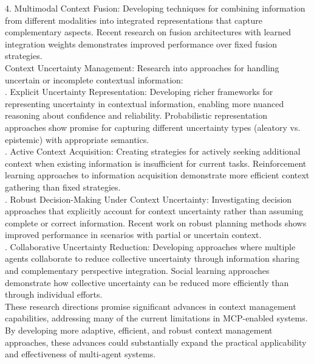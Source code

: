 4. Multimodal Context Fusion: Developing techniques for combining information from different modalities into integrated representations that capture complementary aspects. Recent research on fusion architectures with learned integration weights demonstrates improved performance over fixed fusion strategies.\\ \newline
Context Uncertainty Management: Research into approaches for handling uncertain or incomplete contextual information:\\ . Explicit Uncertainty Representation: Developing richer frameworks for representing uncertainty in contextual information, enabling more nuanced reasoning about confidence and reliability. Probabilistic representation approaches show promise for capturing different uncertainty types (aleatory vs. epistemic) with appropriate semantics.\\ . Active Context Acquisition: Creating strategies for actively seeking additional context when existing information is insufficient for current tasks. Reinforcement learning approaches to information acquisition demonstrate more efficient context gathering than fixed strategies.\\ . Robust Decision-Making Under Context Uncertainty: Investigating decision approaches that explicitly account for context uncertainty rather than assuming complete or correct information. Recent work on robust planning methods shows improved performance in scenarios with partial or uncertain context.\\ . Collaborative Uncertainty Reduction: Developing approaches where multiple agents collaborate to reduce collective uncertainty through information sharing and complementary perspective integration. Social learning approaches demonstrate how collective uncertainty can be reduced more efficiently than through individual efforts.\\ \newline
These research directions promise significant advances in context management capabilities, addressing many of the current limitations in MCP-enabled systems. By developing more adaptive, efficient, and robust context management approaches, these advances could substantially expand the practical applicability and effectiveness of multi-agent systems.\\
